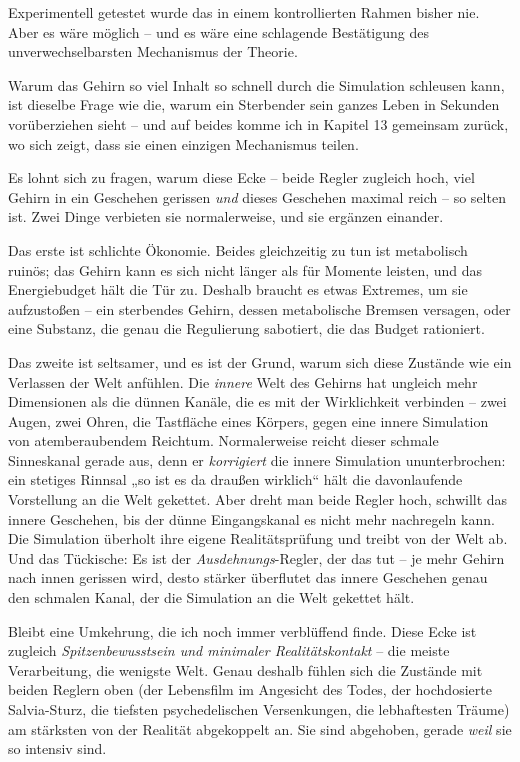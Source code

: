 \documentclass[11pt, twoside, openright]{book}
\begin{document}
Experimentell getestet wurde das in einem kontrollierten Rahmen bisher nie. Aber es wäre möglich -- und es wäre eine schlagende Bestätigung des unverwechselbarsten Mechanismus der Theorie.

Warum das Gehirn so viel Inhalt so schnell durch die Simulation schleusen kann, ist dieselbe Frage wie die, warum ein Sterbender sein ganzes Leben in Sekunden vorüberziehen sieht -- und auf beides komme ich in Kapitel 13 gemeinsam zurück, wo sich zeigt, dass sie einen einzigen Mechanismus teilen.

Es lohnt sich zu fragen, warum diese Ecke -- beide Regler zugleich hoch, viel Gehirn in ein Geschehen gerissen \textit{und} dieses Geschehen maximal reich -- so selten ist. Zwei Dinge verbieten sie normalerweise, und sie ergänzen einander.

Das erste ist schlichte Ökonomie. Beides gleichzeitig zu tun ist metabolisch ruinös; das Gehirn kann es sich nicht länger als für Momente leisten, und das Energiebudget hält die Tür zu. Deshalb braucht es etwas Extremes, um sie aufzustoßen -- ein sterbendes Gehirn, dessen metabolische Bremsen versagen, oder eine Substanz, die genau die Regulierung sabotiert, die das Budget rationiert.

Das zweite ist seltsamer, und es ist der Grund, warum sich diese Zustände wie ein Verlassen der Welt anfühlen. Die \textit{innere} Welt des Gehirns hat ungleich mehr Dimensionen als die dünnen Kanäle, die es mit der Wirklichkeit verbinden -- zwei Augen, zwei Ohren, die Tastfläche eines Körpers, gegen eine innere Simulation von atemberaubendem Reichtum. Normalerweise reicht dieser schmale Sinneskanal gerade aus, denn er \textit{korrigiert} die innere Simulation ununterbrochen: ein stetiges Rinnsal „so ist es da draußen wirklich“ hält die davonlaufende Vorstellung an die Welt gekettet. Aber dreht man beide Regler hoch, schwillt das innere Geschehen, bis der dünne Eingangskanal es nicht mehr nachregeln kann. Die Simulation überholt ihre eigene Realitätsprüfung und treibt von der Welt ab. Und das Tückische: Es ist der \textit{Ausdehnungs}-Regler, der das tut -- je mehr Gehirn nach innen gerissen wird, desto stärker überflutet das innere Geschehen genau den schmalen Kanal, der die Simulation an die Welt gekettet hält.

Bleibt eine Umkehrung, die ich noch immer verblüffend finde. Diese Ecke ist zugleich \textit{Spitzenbewusstsein und minimaler Realitätskontakt} -- die meiste Verarbeitung, die wenigste Welt. Genau deshalb fühlen sich die Zustände mit beiden Reglern oben (der Lebensfilm im Angesicht des Todes, der hochdosierte Salvia-Sturz, die tiefsten psychedelischen Versenkungen, die lebhaftesten Träume) am stärksten von der Realität abgekoppelt an. Sie sind abgehoben, gerade \textit{weil} sie so intensiv sind.
\end{document}
